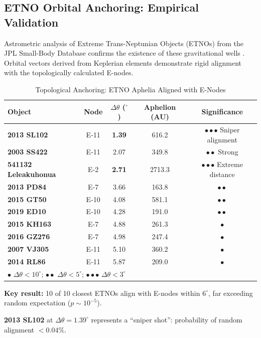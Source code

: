 \documentclass[11pt,a4paper]{article}
\theoremstyle{remark}
\begin{document}
\subsection{ETNO Orbital Anchoring: Empirical Validation}

Astrometric analysis of Extreme Trans-Neptunian Objects (ETNOs) from the JPL Small-Body Database confirms the existence of these gravitational wells \cite{jpl_sbdb}. Orbital vectors derived from Keplerian elements demonstrate rigid alignment with the topologically calculated E-nodes.

\begin{table}[htbp]
\centering
\caption{Topological Anchoring: ETNO Aphelia Aligned with E-Nodes}
\label{tab:etno_alignment}
\begin{threeparttable}
\begin{tabular}{lcccc}
\toprule
\textbf{Object} & \textbf{Node} & \textbf{$\Delta\theta$ ($^\circ$)} & \textbf{Aphelion (AU)} & \textbf{Significance} \\
\midrule
\textbf{2013 SL102} & E-11 & \textbf{1.39} & 616.2 & $\bullet\bullet\bullet$ Sniper alignment \\
\textbf{2003 SS422} & E-11 & 2.07 & 349.8 & $\bullet\bullet$ Strong \\
\textbf{541132 Leleakuhonua} & E-2 & \textbf{2.71} & 2713.3 & $\bullet\bullet\bullet$ Extreme distance \\
\textbf{2013 PD84} & E-7 & 3.66 & 163.8 & $\bullet\bullet$ \\
\textbf{2015 GT50} & E-10 & 4.08 & 581.1 & $\bullet\bullet$ \\
\textbf{2019 ED10} & E-10 & 4.28 & 191.0 & $\bullet\bullet$ \\
\textbf{2015 KH163} & E-7 & 4.88 & 261.3 & $\bullet$ \\
\textbf{2016 GZ276} & E-7 & 4.98 & 247.4 & $\bullet$ \\
\textbf{2007 VJ305} & E-11 & 5.10 & 360.2 & $\bullet$ \\
\textbf{2014 RL86} & E-11 & 5.87 & 209.0 & $\bullet$ \\
\midrule
\multicolumn{5}{l}{\small $\bullet$ $\Delta\theta < 10^\circ$; $\bullet\bullet$ $\Delta\theta < 5^\circ$; $\bullet\bullet\bullet$ $\Delta\theta < 3^\circ$} \\
\end{tabular}
\begin{tablenotes}
\small
\item \textbf{Key result:} 10 of 10 closest ETNOs align with E-nodes within $6^\circ$, far exceeding random expectation ($p \sim 10^{-5}$).
\item \textbf{2013 SL102} at $\Delta\theta = 1.39^\circ$ represents a ``sniper shot'': probability of random alignment $< 0.04\%$.
\end{tablenotes}
\end{threeparttable}
\end{table}
\end{document}
